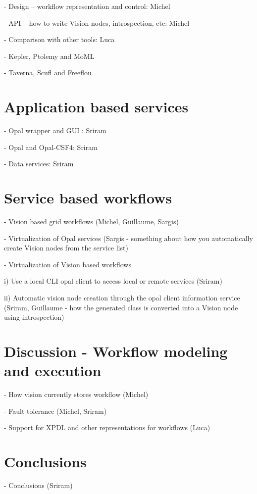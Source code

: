 \documentclass[conference]{IEEEtran}
\begin{document}
- Design -- workflow representation and control: Michel

- API -- how to write Vision nodes, introspection, etc: Michel

- Comparison with other tools: Luca

  - Kepler, Ptolemy and MoML

  - Taverna, Scufl and Freeflou

\section {Application based services}

- Opal wrapper and GUI \cite{opal}: Sriram 

- Opal and Opal-CSF4: Sriram

- Data services: Sriram

\section {Service based workflows}

- Vision based grid workflows (Michel, Guillaume, Sargis)

- Virtualization of Opal services (Sargis - something about how you
automatically create Vision nodes from the service list)

- Virtualization of Vision based workflows

  i) Use a local CLI opal client to access local or remote services (Sriram)

 ii) Automatic vision node creation through the opal client information
 service (Sriram, Guillaume - how the generated class is converted into a Vision node using introspection)

\section {Discussion - Workflow modeling and execution}

- How vision currently stores workflow (Michel)

- Fault tolerance (Michel, Sriram)

- Support for XPDL and other representations for workflows (Luca)

\section {Conclusions}

- Conclusions (Sriram)




\end{document}
